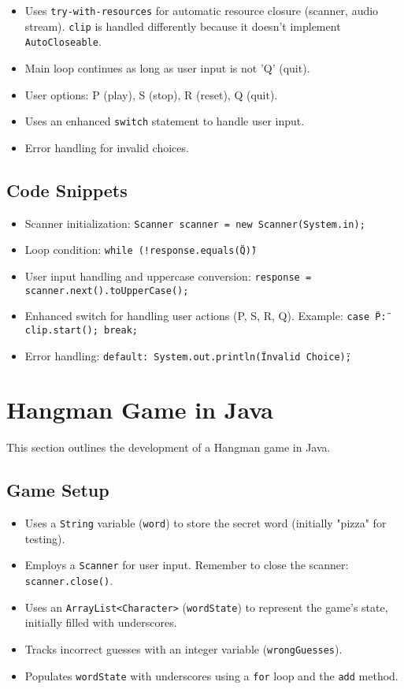\documentclass{article}
\begin{document}
\begin{itemize}
\begin{itemize}
\item Uses \texttt{try-with-resources} for automatic resource closure (scanner, audio stream).  \texttt{clip} is handled differently because it doesn't implement \texttt{AutoCloseable}.
\item Main loop continues as long as user input is not 'Q' (quit).
\item User options: P (play), S (stop), R (reset), Q (quit).
\item Uses an enhanced \texttt{switch} statement to handle user input.
\item Error handling for invalid choices.
\end{itemize}

\subsection{Code Snippets}

\begin{itemize}
\item Scanner initialization: \texttt{Scanner scanner = new Scanner(System.in);}
\item Loop condition: \texttt{while (!response.equals(\"Q\"))}
\item User input handling and uppercase conversion: \texttt{response = scanner.next().toUpperCase();}
\item Enhanced switch for handling user actions (P, S, R, Q).  Example: \texttt{case \"P\": clip.start(); break;}
\item Error handling: \texttt{default: System.out.println(\"Invalid Choice\");}
\end{itemize}

\section{Hangman Game in Java}

This section outlines the development of a Hangman game in Java.

\subsection{Game Setup}

\begin{itemize}
\item Uses a \texttt{String} variable (\texttt{word}) to store the secret word (initially "pizza" for testing).
\item Employs a \texttt{Scanner} for user input.  Remember to close the scanner: \texttt{scanner.close()}.
\item Uses an \texttt{ArrayList<Character>} (\texttt{wordState}) to represent the game's state, initially filled with underscores.
\item Tracks incorrect guesses with an integer variable (\texttt{wrongGuesses}).
\item Populates \texttt{wordState} with underscores using a \texttt{for} loop and the \texttt{add} method.
\end{itemize}


\end{itemize}
\end{document}
